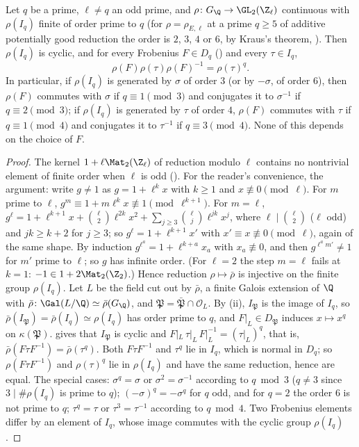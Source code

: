 \begin{corollary}\label{cor:ant:frobsigma}
Let $q$ be a prime, $\ell\ne q$ an odd prime, and $\rho\colon G_\Q\to\GL_2(\Z_\ell)$ continuous with $\rho(I_q)$ finite of order prime to $q$ (for
$\rho=\rho_{E,\ell}$ at a prime $q\ge5$ of additive potentially good reduction the order is $2$, $3$, $4$ or $6$, by Kraus's theorem, ).
Then $\rho(I_q)$ is cyclic, and for every Frobenius $F\in D_q$ () and every $\tau\in I_q$,
\[
\rho(F)\rho(\tau)\rho(F)^{-1}=\rho(\tau)^q.
\]
In particular, if $\rho(I_q)$ is generated by $\sigma$ of order $3$ (or by $-\sigma$, of order $6$), then $\rho(F)$ commutes with $\sigma$ if $q\equiv1\pmod3$
and conjugates it to $\sigma^{-1}$ if $q\equiv2\pmod3$; if $\rho(I_q)$ is generated by $\tau$ of order $4$, $\rho(F)$ commutes with $\tau$ if $q\equiv1\pmod4$ and
conjugates it to $\tau^{-1}$ if $q\equiv3\pmod4$. None of this depends on the choice of $F$.
\end{corollary}

\begin{proof}
The kernel $1+\ell\Mat_2(\Z_\ell)$ of reduction modulo $\ell$ contains no nontrivial element of finite order when $\ell$ is odd ().
For the reader's convenience, the argument: write $g\ne1$ as $g=1+\ell^kx$ with $k\ge1$ and $x\not\equiv0\pmod\ell$. For $m$ prime to $\ell$,
$g^m\equiv1+m\ell^kx\not\equiv1\pmod{\ell^{k+1}}$. For $m=\ell$, $g^\ell=1+\ell^{k+1}x+\binom\ell2\ell^{2k}x^2+\sum_{j\ge3}\binom\ell j\ell^{jk}x^j$, where
$\ell\mid\binom\ell2$ ($\ell$ odd) and $jk\ge k+2$ for $j\ge3$; so $g^\ell=1+\ell^{k+1}x'$ with $x'\equiv x\not\equiv0\pmod\ell$, again of the same shape. By induction
$g^{\ell^a}=1+\ell^{k+a}x_a$ with $x_a\not\equiv0$, and then $g^{\ell^am'}\ne1$ for $m'$ prime to $\ell$; so $g$ has infinite order. (For $\ell=2$ the step
$m=\ell$ fails at $k=1$: $-1\in1+2\Mat_2(\Z_2)$.) Hence
reduction $\rho\mapsto\bar\rho$ is injective on the finite group $\rho(I_q)$. Let $L$ be the field cut out by $\bar\rho$, a finite Galois extension of $\Q$
with $\bar\rho\colon\Gal(L/\Q)\simeq\bar\rho(G_\Q)$, and $\mathfrak P=\bar{\mathfrak P}\cap\mathcal O_L$. By (ii), $I_{\mathfrak P}$ is the
image of $I_q$, so $\bar\rho(I_{\mathfrak P})=\bar\rho(I_q)\simeq\rho(I_q)$ has order prime to $q$, and $F|_L\in D_{\mathfrak P}$ induces $x\mapsto x^q$ on
$\kappa(\mathfrak P)$.  gives that $I_{\mathfrak P}$ is cyclic and $F|_L\,\tau|_L\,F|_L^{-1}=(\tau|_L)^q$, that is,
$\bar\rho(F\tau F^{-1})=\bar\rho(\tau^q)$. Both $F\tau F^{-1}$ and $\tau^q$ lie in $I_q$, which is normal in $D_q$; so $\rho(F\tau F^{-1})$ and
$\rho(\tau)^q$ lie in $\rho(I_q)$ and have the same reduction, hence are equal. The special cases: $\sigma^q=\sigma$ or $\sigma^2=\sigma^{-1}$ according to
$q\bmod3$ ($q\ne3$ since $3\mid\#\rho(I_q)$ is prime to $q$); $(-\sigma)^q=-\sigma^q$ for $q$ odd, and for $q=2$ the order $6$ is not prime to $q$; $\tau^q=\tau$
or $\tau^3=\tau^{-1}$ according to $q\bmod4$. Two Frobenius elements differ by an element of $I_q$, whose image commutes with the cyclic group $\rho(I_q)$.
\end{proof}

